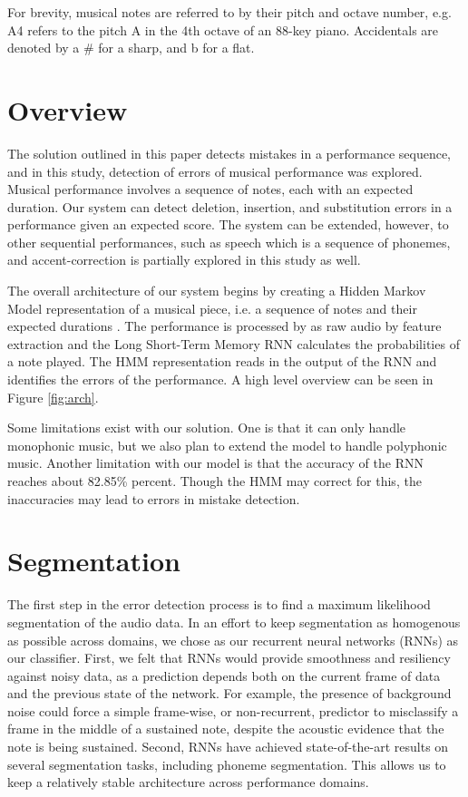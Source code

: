 \documentclass[twocolumn]{article}
\begin{document}
For brevity, musical notes are referred to by their pitch and octave number, e.g. A4 refers to the pitch A in the 4th octave of an 88-key piano. Accidentals are denoted by a \# for a sharp, and b for a flat.

\section{Overview}

The solution outlined in this paper detects mistakes in a performance sequence, and in this study, detection of errors of musical performance was explored. Musical performance involves a sequence of notes, each with an expected duration. Our system can detect deletion, insertion, and substitution errors in a performance given an expected score. The system can be extended, however, to other sequential performances, such as speech which is a sequence of phonemes, and accent-correction is partially explored in this study as well.

The overall architecture of our system begins by creating a Hidden Markov Model representation of a musical piece, i.e. a sequence of notes and their expected durations \cite{rabiner1989tutorial}. The performance is processed by as raw audio by feature extraction and the Long Short-Term Memory RNN calculates the probabilities of a note played. The HMM representation reads in the output of the RNN and identifies the errors of the performance. A high level overview can be seen in Figure \ref{fig:arch}.

Some limitations exist with our solution. One is that it can only handle monophonic music, but we also plan to extend the model to handle polyphonic music. Another limitation with our model is that the accuracy of the RNN reaches about 82.85\% percent. Though the HMM may correct for this, the inaccuracies may lead to errors in mistake detection.

\section{Segmentation}

The first step in the error detection process is to find a maximum likelihood segmentation of the audio data. In an effort to keep segmentation as homogenous as possible across domains, we chose as our recurrent neural networks (RNNs) as our classifier. First, we felt that RNNs would provide smoothness and resiliency against noisy data, as a prediction depends both on the current frame of data and the previous state of the network. For example, the presence of background noise could force a simple frame-wise, or non-recurrent, predictor to misclassify a frame in the middle of a sustained note, despite the acoustic evidence that the note is being sustained. Second, RNNs have achieved state-of-the-art results on several segmentation tasks, including phoneme segmentation. This allows us to keep a relatively stable architecture across performance domains.
\end{document}
